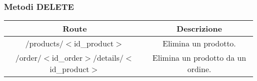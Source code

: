 \subsubsection{Metodi DELETE}
\begin{center}
\begin{tabular}{|c|c|}
\hline
Route & Descrizione \\
\hline
\multirow{2}{20em}{/products/$<$id\_product$>$} & \multirow{2}{15em}{Elimina un prodotto.}\\
 & \\
 \hline
 \multirow{2}{20em}{/order/$<$id\_order$>$/details/$<$id\_product$>$} & \multirow{2}{15em}{Elimina un prodotto da un ordine.}\\
 & \\
 \hline
\end{tabular}
\end{center}